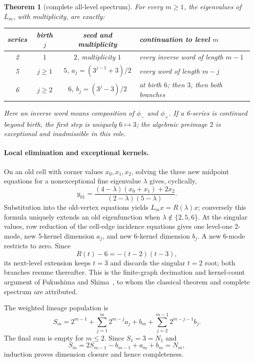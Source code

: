 \documentclass[9pt]{extarticle}
\newtheorem{theorem}{Theorem}
\begin{document}
\begin{theorem}[complete all-level spectrum]
For every $m\ge1$, the eigenvalues of $L_m$, with multiplicity, are exactly:
\begin{center}\small
\begin{tabular}{cccl}
\toprule
series & birth $j$ & seed and multiplicity & continuation to level $m$\\
\midrule
2 & $1$ & $2$, multiplicity $1$ & every inverse word of length $m-1$\\
5 & $j\ge1$ & $5$, $a_j=(3^{j-1}+3)/2$ & every word of length $m-j$\\
6 & $j\ge2$ & $6$, $b_j=(3^j-3)/2$ & at birth $6$; then $3$, then both branches\\
\bottomrule
\end{tabular}
\end{center}
Here an inverse word means composition of $\phi_-$ and $\phi_+$.  If a
6-series is continued beyond birth, the first step is uniquely $6\mapsto3$;
the algebraic preimage $2$ is exceptional and inadmissible in this role.
\end{theorem}

\paragraph{Local elimination and exceptional kernels.}
On an old cell with corner values $x_0,x_1,x_2$, solving the three new
midpoint equations for a nonexceptional fine eigenvalue $\lambda$ gives,
cyclically,
\[
 y_{01}=\frac{(4-\lambda)(x_0+x_1)+2x_2}
 {(2-\lambda)(5-\lambda)}.
\]
Substitution into the old-vertex equations yields
$L_mx=R(\lambda)x$; conversely this formula uniquely extends an old
eigenfunction when $\lambda\notin\{2,5,6\}$.  At the singular values, row
reduction of the cell-edge incidence equations gives one level-one 2-mode,
new 5-kernel dimension $a_j$, and new 6-kernel dimension $b_j$.  A new
6-mode restricts to zero.  Since
\[
 R(t)-6=-(t-2)(t-3),
\]
its next-level extension keeps $t=3$ and discards the singular $t=2$ root;
both branches resume thereafter.  This is the finite-graph decimation and
kernel-count argument of Fukushima and Shima~\cite{FS92}, to whom the
classical theorem and complete spectrum are attributed.

The weighted lineage population is
\[
 S_m=2^{m-1}+\sum_{j=1}^m2^{m-j}a_j+b_m
 +\sum_{j=2}^{m-1}2^{m-j-1}b_j.
\]
The final sum is empty for $m\le2$.  Since $S_1=3=N_1$ and
\[
 S_m=2S_{m-1}-b_{m-1}+a_m+b_m=N_m,
\]
induction proves dimension closure and hence completeness.
\end{document}
